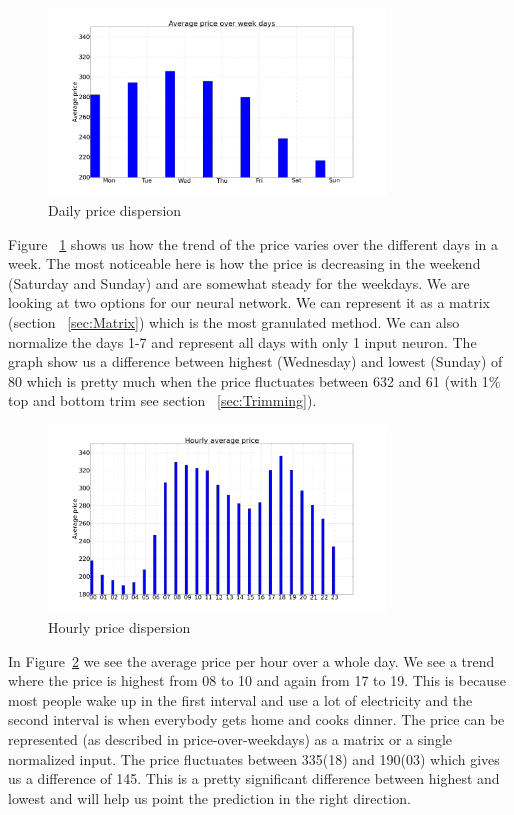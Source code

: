 \begin{figure}[H]
\centering
\includegraphics[width=0.8\textwidth ]{billeder/energy_price_plots/Average_price_over_weekdays.png}
\caption{Daily price dispersion}
\label{fig:price_over_weekdays}
\end{figure}

Figure ~\ref{fig:price_over_weekdays} shows us how the trend of the price varies over the different days in a week. The most noticeable here is how the price is decreasing in the weekend (Saturday and Sunday) and are somewhat steady for the weekdays. We are looking at two options for our neural network. We can represent it as a matrix (section ~\ref{sec:Matrix}) which is the most granulated method. We can also normalize the days 1-7 and represent all days with only 1 input neuron.
The graph show us a difference between highest (Wednesday) and lowest (Sunday) of 80 which is pretty much when the price fluctuates between 632 and 61 (with 1\% top and bottom trim see section ~\ref{sec:Trimming}).

\begin{figure}[H]
\centering
\includegraphics[width=0.8\textwidth ]{billeder/energy_price_plots/price_per_hour.png}
\caption{Hourly price dispersion}
\label{fig:price_per_hour}
\end{figure}

In Figure~\ref{fig:price_per_hour} we see the average price per hour over a whole day. We see a trend where the price is highest from 08 to 10 and again from 17 to 19. This is because most people wake up in the first interval and use a lot of electricity and the second interval is when everybody gets home and cooks dinner. The price can be represented (as described in price-over-weekdays) as a matrix or a single normalized input. The price fluctuates between 335(18) and 190(03) which gives us a difference of 145. This is a pretty significant difference between highest and lowest and will help us point the prediction in the right direction.

